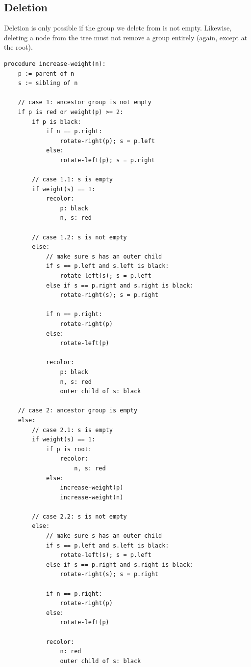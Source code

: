 \documentclass{article}
\begin{document}
\subsection{Deletion}

Deletion is only possible if the group we delete from is not empty. Likewise, deleting a
node from the tree must not remove a group entirely (again, except at the root).

\begin{small}
\begin{verbatim}
procedure increase-weight(n):
    p := parent of n
    s := sibling of n

    // case 1: ancestor group is not empty
    if p is red or weight(p) >= 2:
        if p is black:
            if n == p.right:
                rotate-right(p); s = p.left
            else:
                rotate-left(p); s = p.right

        // case 1.1: s is empty
        if weight(s) == 1:
            recolor:
                p: black
                n, s: red

        // case 1.2: s is not empty
        else:
            // make sure s has an outer child
            if s == p.left and s.left is black:
                rotate-left(s); s = p.left
            else if s == p.right and s.right is black:
                rotate-right(s); s = p.right

            if n == p.right:
                rotate-right(p)
            else:
                rotate-left(p)

            recolor:
                p: black
                n, s: red
                outer child of s: black

    // case 2: ancestor group is empty
    else:
        // case 2.1: s is empty
        if weight(s) == 1:
            if p is root:
                recolor:
                    n, s: red
            else:
                increase-weight(p)
                increase-weight(n)

        // case 2.2: s is not empty
        else:
            // make sure s has an outer child
            if s == p.left and s.left is black:
                rotate-left(s); s = p.left
            else if s == p.right and s.right is black:
                rotate-right(s); s = p.right

            if n == p.right:
                rotate-right(p)
            else:
                rotate-left(p)

            recolor:
                n: red
                outer child of s: black



\end{verbatim}
\end{small}
\end{document}
